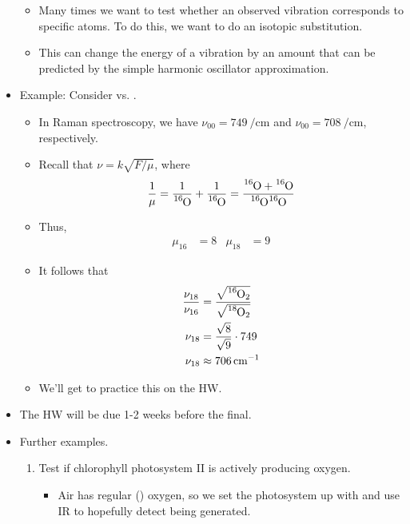 \documentclass[../notes.tex]{subfiles}
\begin{document}
\begin{itemize}
    \begin{itemize}
        \item Many times we want to test whether an observed vibration corresponds to specific atoms. To do this, we want to do an isotopic substitution.
        \item This can change the energy of a vibration by an amount that can be predicted by the simple harmonic oscillator approximation.
    \end{itemize}
    \item Example: Consider  vs. .
    \begin{itemize}
        \item In Raman spectroscopy, we have $\nu_{00}=\SI{749}{\per\centi\meter}$ and $\nu_{00}=\SI{708}{\per\centi\meter}$, respectively.
        \item Recall that $\nu=k\sqrt{F/\mu}$, where
        \begin{equation*}
            \frac{1}{\mu} = \frac{1}{\ce{{}^16O}}+\frac{1}{\ce{{}^16O}}
            = \frac{\ce{{}^16O}+\ce{{}^16O}}{\ce{{}^16O}\ce{{}^16O}}
        \end{equation*}
        \item Thus,
        \begin{align*}
            \mu_{16} &= 8&
            \mu_{18} &= 9
        \end{align*}
        \item It follows that
        \begin{align*}
            \frac{\nu_{18}}{\nu_{16}} &= \frac{\sqrt{\ce{{}^16O2}}}{\sqrt{\ce{{}^18O2}}}\\
            \nu_{18} &= \frac{\sqrt{8}}{\sqrt{9}}\cdot 749\\
            \nu_{18} &\approx \SI{706}{\per\centi\meter}
        \end{align*}
        \item We'll get to practice this on the HW.
    \end{itemize}
    \item The HW will be due 1-2 weeks before the final.
    \item Further examples.
    \begin{enumerate}
        \item Test if chlorophyll photosystem II is actively producing oxygen.
        \begin{itemize}
            \item Air has regular () oxygen, so we set the photosystem up with  and use IR to hopefully detect  being generated.

\end{itemize}
\end{enumerate}
\end{itemize}
\end{document}
